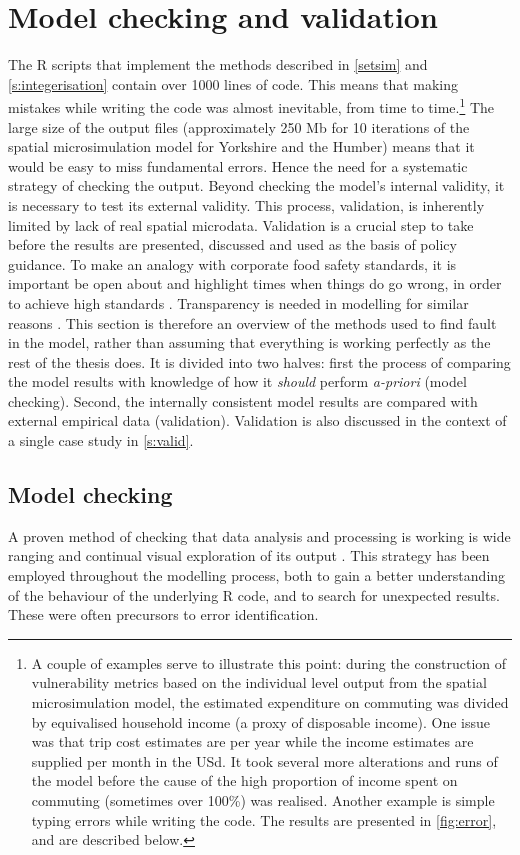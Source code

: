 \section{Model checking and validation} \label{smeval}

The R scripts that implement the methods described in \cref{setsim} and
\cref{s:integerisation} contain over 1000 lines of code.
This means that making mistakes while writing the code was almost inevitable,
from time to
time.\footnote{
A couple of examples serve to illustrate this point: during the construction of
vulnerability metrics based on the individual level output from the spatial
microsimulation model, the estimated expenditure on commuting was divided
by equivalised household income (a proxy of disposable income). 
One issue was that trip cost estimates are per year
while the income estimates are supplied per month in the USd. It took several
more alterations and runs of the model before the cause of the high proportion
of income spent on commuting (sometimes over 100\%) was realised. Another
example is simple typing errors while writing the code. The results are
presented in \cref{fig:error}, and are described below.
}
The large size of
the output files (approximately 250 Mb for 10 iterations of the spatial
microsimulation model for Yorkshire and the Humber) means that it would
be easy to miss fundamental errors. Hence the need for a
systematic strategy of checking the output. Beyond checking the model's
internal validity, it is necessary to test its external validity. This process,
validation, is inherently limited by lack of real spatial microdata.
Validation is a crucial step to take before the results are
presented, discussed and used as the basis of policy guidance. To make an
analogy with corporate food safety standards, it is important be open about and
highlight times when things do go wrong, in order to achieve high standards
\citep{Powell2011}. Transparency is needed in modelling for similar reasons
\citep{Tamminga2012}. This section is therefore an overview of the methods used
to find fault in the model, rather than assuming that everything is working
perfectly as the rest of the thesis does. It is divided into two halves: first
the process
of comparing the model results with knowledge of how it \emph{should}
perform \emph{a-priori} (model checking). Second, the
internally consistent model results are compared with external
empirical data (validation).
Validation is also discussed in the context of a single case study
in \cref{s:valid}.

\subsection{Model checking}
A proven method of checking that data analysis and processing is working
is wide ranging and continual visual exploration of its output
\citep{janert2010data}.
This strategy has been employed
throughout the modelling process, both to gain a better understanding of the
behaviour of the underlying R code, and to search for unexpected
results. These were often precursors to error identification.


